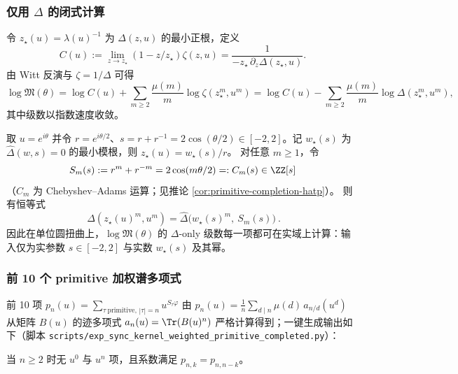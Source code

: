 \subsubsection{仅用 \texorpdfstring{$\Delta$}{Delta} 的闭式计算}\label{app:delta-only}
令 $z_\star(u)=\lambda(u)^{-1}$ 为 $\Delta(z,u)$ 的最小正根，定义
\[
C(u):=\lim_{z\to z_\star}(1-z/z_\star)\zeta(z,u)=\frac{1}{-z_\star\,\partial_z\Delta(z_\star,u)}.
\]
由 Witt 反演与 $\zeta=1/\Delta$ 可得
\[
\log\mathfrak{M}(\theta)
=\log C(u)+\sum_{m\ge 2}\frac{\mu(m)}{m}\log\zeta(z_\star^m,u^m)
=\log C(u)-\sum_{m\ge 2}\frac{\mu(m)}{m}\log\Delta(z_\star^m,u^m),
\]
其中级数以指数速度收敛。

\begin{corollary}\label{cor:sync-kernel-weighted-logM-completed-real}
取 \(u=e^{i\theta}\) 并令 \(r=e^{i\theta/2}\)、\(s=r+r^{-1}=2\cos(\theta/2)\in[-2,2]\)。记 \(w_\star(s)\) 为 \(\widehat\Delta(w,s)=0\) 的最小模根，则 \(z_\star(u)=w_\star(s)/r\)。
对任意 \(m\ge 1\)，令
\[
S_m(s):=r^m+r^{-m}=2\cos(m\theta/2)=:C_m(s)\in\ZZ[s]
\]
（\(C_m\) 为 Chebyshev--Adams 运算；见推论 \ref{cor:primitive-completion-hatp}）。
则有恒等式
\[
\boxed{\ \Delta(z_\star(u)^m,u^m)=\widehat\Delta\!\bigl(w_\star(s)^m,\ S_m(s)\bigr)\ }.
\]
因此在单位圆扭曲上，\(\log\mathfrak{M}(\theta)\) 的 \(\Delta\)-only 级数每一项都可在实域上计算：输入仅为实参数 \(s\in[-2,2]\) 与实数 \(w_\star(s)\) 及其幂。
\end{corollary}

\subsubsection{前 10 个 primitive 加权谱多项式}\label{app:weighted-primitive-table}
前 10 项 $p_n(u)=\sum_{\tau\ \mathrm{primitive},\,|\tau|=n}u^{S_\tau\varphi}$ 由
\(
p_n(u)=\frac{1}{n}\sum_{d\mid n}\mu(d)\,a_{n/d}(u^d)
\)
从矩阵 \(B(u)\) 的迹多项式 \(a_n(u)=\Tr(B(u)^n)\) 严格计算得到；一键生成输出如下（脚本 \texttt{scripts/exp\_sync\_kernel\_weighted\_primitive\_completed.py}）：


当 $n\ge 2$ 时无 $u^0$ 与 $u^n$ 项，且系数满足 $p_{n,k}=p_{n,n-k}$。

